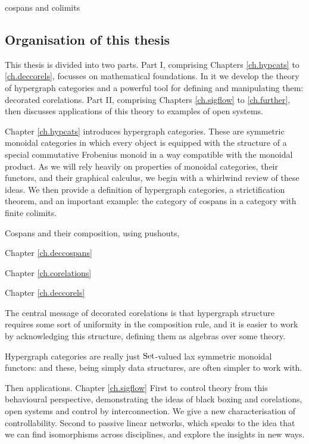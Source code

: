 cospans and colimits



\subsection*{Organisation of this thesis}

This thesis is divided into two parts. Part I, comprising Chapters
\ref{ch.hypcats} to \ref{ch.deccorels}, focusses on mathematical foundations. In
it we develop the theory of hypergraph categories and a powerful tool for
defining and manipulating them: decorated corelations. Part II, comprising
Chapters \ref{ch.sigflow} to \ref{ch.further}, then discusses applications of
this theory to examples of open systems.

Chapter \ref{ch.hypcats} introduces hypergraph categories. These are symmetric
monoidal categories in which every object is equipped with the structure of a
special commutative Frobenius monoid in a way compatible with the monoidal
product. As we will rely heavily on properties of monoidal categories, their
functors, and their graphical calculus, we begin with a whirlwind review of
these ideas. We then provide a definition of hypergraph categories, a
strictification theorem, and an important example: the category of cospans in a
category with finite colimits.

Cospans and their composition, using pushouts, 

Chapter \ref{ch.deccospans}

Chapter \ref{ch.corelations}

Chapter \ref{ch.deccorels}

The central message of decorated corelations is that hypergraph structure
requires some sort of uniformity in the composition rule, and it is easier to
work by acknowledging this structure, defining them as algebras over some
theory. 

Hypergraph categories are really just $\mathrm{Set}$-valued lax symmetric monoidal
functors: and these, being simply data structures, are often simpler to work
with.


Then applications. Chapter \ref{ch.sigflow} First to control theory from this behavioural perspective,
demonstrating the ideas of black boxing and corelations, open systems and
control by interconnection. We give a new characterisation of controllability.
Second to passive linear networks, which speaks to the idea that we can find
isomorphisms across disciplines, and explore the insights in new ways.

